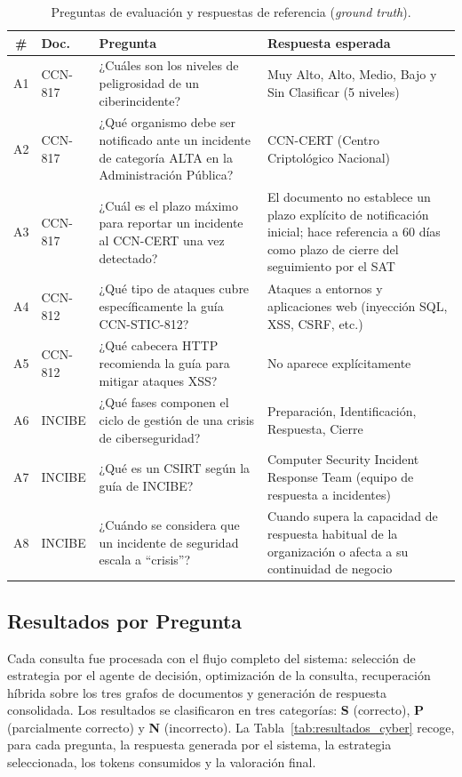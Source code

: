 \begin{table}[ht]
\centering
\renewcommand{\arraystretch}{1.4}
\caption{Preguntas de evaluación y respuestas de referencia (\textit{ground truth}).}
\label{tab:prueba_cyber_preguntas}
\begin{tabularx}{\textwidth}{|c|l|X|X|}
\hline
\textbf{\#} & \textbf{Doc.} & \textbf{Pregunta} & \textbf{Respuesta esperada} \\ \hline
A1 & CCN-817 & ¿Cuáles son los niveles de peligrosidad de un ciberincidente? & Muy Alto, Alto, Medio, Bajo y Sin Clasificar (5 niveles) \\ \hline
A2 & CCN-817 & ¿Qué organismo debe ser notificado ante un incidente de categoría ALTA en la Administración Pública? & CCN-CERT (Centro Criptológico Nacional) \\ \hline
A3 & CCN-817 & ¿Cuál es el plazo máximo para reportar un incidente al CCN-CERT una vez detectado? & El documento no establece un plazo explícito de notificación inicial; hace referencia a 60 días como plazo de cierre del seguimiento por el SAT \\ \hline
A4 & CCN-812 & ¿Qué tipo de ataques cubre específicamente la guía CCN-STIC-812? & Ataques a entornos y aplicaciones web (inyección SQL, XSS, CSRF, etc.) \\ \hline
A5 & CCN-812 & ¿Qué cabecera HTTP recomienda la guía para mitigar ataques XSS? & No aparece explícitamente \\ \hline
A6 & INCIBE & ¿Qué fases componen el ciclo de gestión de una crisis de ciberseguridad? & Preparación, Identificación, Respuesta, Cierre \\ \hline
A7 & INCIBE & ¿Qué es un CSIRT según la guía de INCIBE? & Computer Security Incident Response Team (equipo de respuesta a incidentes) \\ \hline
A8 & INCIBE & ¿Cuándo se considera que un incidente de seguridad escala a ``crisis''? & Cuando supera la capacidad de respuesta habitual de la organización o afecta a su continuidad de negocio \\ \hline
\end{tabularx}
\end{table}

\subsection{Resultados por Pregunta}

Cada consulta fue procesada con el flujo completo del sistema: selección de estrategia por el agente de decisión, optimización de la consulta, recuperación híbrida sobre los tres grafos de documentos y generación de respuesta consolidada. Los resultados se clasificaron en tres categorías: \textbf{S} (correcto), \textbf{P} (parcialmente correcto) y \textbf{N} (incorrecto). La Tabla~\ref{tab:resultados_cyber} recoge, para cada pregunta, la respuesta generada por el sistema, la estrategia seleccionada, los tokens consumidos y la valoración final.


